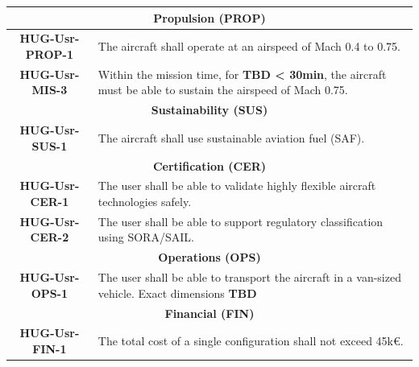 \begin{table}[H]
\begin{tabular}{|c|p{13cm}|}
        \multicolumn{2}{|c|}{\textbf{Propulsion (PROP)}} \\
        \hline
        \textbf{HUG-Usr-PROP-1} & The aircraft shall operate at an airspeed of Mach 0.4 to 0.75.\\
        \hline
        \textbf{HUG-Usr-MIS-3} & Within the mission time, for \textbf{TBD < 30min}, the aircraft must be able to sustain the airspeed of Mach 0.75. \\
        \hline

        \multicolumn{2}{|c|}{\textbf{Sustainability (SUS)}} \\
        \hline
        \textbf{HUG-Usr-SUS-1} & The aircraft shall use sustainable aviation fuel (SAF).\\
        \hline

        \multicolumn{2}{|c|}{\textbf{Certification (CER)}} \\
        \hline
        \textbf{HUG-Usr-CER-1} & The user shall be able to validate highly flexible aircraft technologies safely.\\
        \hline
        \textbf{HUG-Usr-CER-2} & The user shall be able to support regulatory classification using SORA/SAIL.\\
        \hline

        \multicolumn{2}{|c|}{\textbf{Operations (OPS)}} \\
        \hline
        \textbf{HUG-Usr-OPS-1} & The user shall be able to transport the aircraft in a van-sized vehicle. Exact dimensions \textbf{TBD}\\
        \hline

        \multicolumn{2}{|c|}{\textbf{Financial (FIN)}} \\
        \hline
        \textbf{HUG-Usr-FIN-1} & The total cost of a single configuration shall not exceed 45k€. \\
        \hline

    \end{tabular}
    \label{tab:user_requirements}
\end{table}